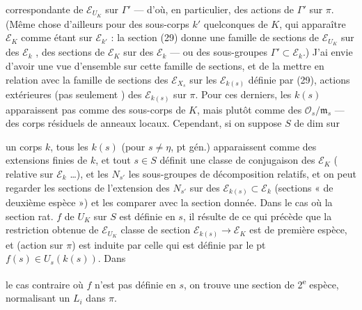 \documentclass[11pt,a4paper]{article}
\begin{document}
correspondante de $\mathcal{E}_{U_K}$ sur $\Gamma'$ — d'où, en particulier, des
actions  de $\Gamma'$ sur $\pi$. (Même chose d'ailleurs
pour des sous-corps $k'$ quelconques de $K$, \add{\ill{}} qui 
apparaître $\mathcal{E}_K$ comme étant sur $\mathcal{E}_{k'}$ : la section (29)
donne une famille de sections de $\mathcal{E}_{U_K}$ sur des $\mathcal{E}_k$
, \ill{} des sections de
$\mathcal{E}_K$ sur des $\mathcal{E}_k$ — ou des sous-groupes
$\Gamma' \subset \mathcal{E}_k$.) J'ai envie d'avoir une vue d'ensemble sur cette
famille de sections, et de la mettre en relation avec la famille de sections des
$\mathcal{E}_{X_s}$ sur les $\mathcal{E}_{k(s)}$ définie par (29),  actions extérieures (pas seulement ) des
$\mathcal{E}_{k(s)}$ sur $\pi$. Pour ces derniers, les $k(s)$ 
apparaissent pas comme des sous-corps de $K$, mais plutôt \add{\ill{}} comme des
$\mathcal{O}_s/\mathfrak{m}_s$ — des corps résiduels de \struck{\ill{}} anneaux
locaux. Cependant, si on suppose $S$ de dim   sur

un corps $k$, tous les $k(s)$ (pour $s \neq \eta$, pt gén.) apparaissent comme des
extensions finies de $k$, et tout $s \in S$ définit une classe de conjugaison
 \ill{} des $\mathcal{E}_K$ (\ill{} 
relative sur $\mathcal{E}_k$ …), et les $N_{s'}$ \ill{} les sous-groupes de
décomposition relatifs, et on peut regarder les sections de l'extension des
$N_{s'}$ sur des $\mathcal{E}_{k(s)} \subset \mathcal{E}_k$ \ill{} (sections
« de deuxième espèce ») et les comparer avec la section donnée. Dans le cas où
la section rat. $f$ de $U_K$ sur $S$ est définie en $s$, il résulte de ce qui
précède que la restriction  obtenue de $\mathcal{E}_{U_K}$
\ill{} classe de section $\mathcal{E}_{k(s)} \to \mathcal{E}_K$ est  de première espèce, et \struck{\ill{}}  \struck{\ill{}}
  (action sur $\pi$) est induite par celle qui est
définie par le pt $f(s) \in U_s(k(s))$. Dans


le cas contraire où $f$ n'est pas définie en $s$, on trouve une
 section de 2\textsuperscript{e} espèce, normalisant un $L_i$
\struck{\ill{}} dans $\pi$.
\end{document}
